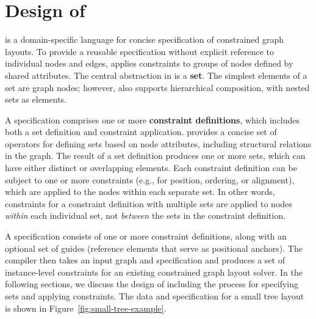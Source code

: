\section{Design of \projectname}
\projectname is a domain-specific language for concise specification of 
constrained graph layouts. To provide a reusable specification 
without explicit reference to individual nodes and edges, \projectname
applies constraints to groups of nodes defined by shared attributes. 
The central abstraction in \projectname is a \textbf{set}. The 
simplest elements of a set are graph nodes; however, \projectname also
supports hierarchical composition, with nested sets as elements.

A \projectname specification comprises one or more \textbf{constraint definitions},
which includes both a set definition and constraint application.
\projectname provides a concise set of operators for defining
sets based on node attributes, including structural relations in the graph.
The result of a set definition produces one or more sets, which 
can have either distinct or overlapping elements. Each constraint definition can 
be subject to one or more constraints (e.g., for position, ordering, 
or alignment), which are applied to the nodes within each separate set. 
In other words, constraints for a constraint definition with multiple sets are 
applied to nodes \emph{within} each individual set, not \emph{between} 
the sets in the constraint definition.


A \projectname specification consists of one or more constraint definitions, 
along with an optional set of guides (reference elements that serve as 
positional anchors). The \projectname compiler then takes an input graph 
and specification and produces a set of instance-level constraints for 
an existing constrained graph layout solver. In the following sections, 
we discuss the design of \projectname including the process for 
specifying sets and applying constraints. The data and \projectname 
specification for a small tree layout is shown in Figure~\ref{fig:small-tree-example}.

\smallTreeExample

